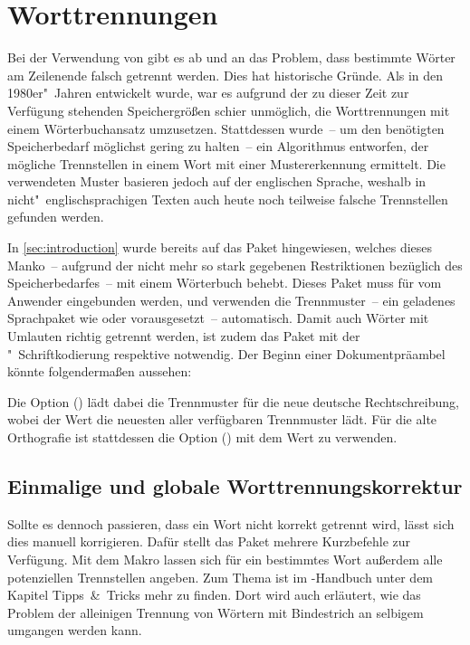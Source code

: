 \documentclass[%
  english,ngerman,%
  cdgeometry=no,DIV=12,automark%
]{tudscrartcl}
\begin{document}
\section{Worttrennungen}
\label{sec:hyphenation}%
%
Bei der Verwendung von  gibt es ab und an das Problem, dass 
bestimmte Wörter am Zeilenende falsch getrennt werden. Dies hat historische 
Gründe. Als  in den 1980er"~Jahren entwickelt wurde, war es 
aufgrund der zu dieser Zeit zur Verfügung stehenden Speichergrößen schier 
unmöglich, die Worttrennungen mit einem Wörterbuchansatz umzusetzen. 
Stattdessen wurde~-- um den benötigten Speicherbedarf möglichst gering zu 
halten~-- ein Algorithmus entworfen, der mögliche Trennstellen in einem Wort 
mit einer Mustererkennung ermittelt. Die verwendeten Muster basieren jedoch 
auf der englischen Sprache, weshalb in nicht"~englischsprachigen Texten auch 
heute noch teilweise falsche Trennstellen gefunden werden.

In \autoref{sec:introduction} wurde bereits auf das Paket 
 hingewiesen, welches dieses Manko~-- aufgrund der nicht 
mehr so stark gegebenen Restriktionen bezüglich des Speicherbedarfes~-- mit 
einem Wörterbuch behebt. Dieses Paket muss für  vom Anwender 
eingebunden werden,  und  verwenden die 
Trennmuster~-- ein geladenes Sprachpaket wie  oder 
 vorausgesetzt~-- automatisch. Damit auch Wörter mit Umlauten 
richtig getrennt werden, ist zudem das Paket  mit der 
"~Schriftkodierung respektive  notwendig. Der 
Beginn einer Dokumentpräambel könnte folgendermaßen aussehen:
%
%
Die Option () lädt dabei die Trennmuster für 
die neue deutsche Rechtschreibung, wobei der Wert  die 
neuesten aller verfügbaren Trennmuster lädt. Für die alte Orthografie ist 
stattdessen die Option () mit dem Wert 
 zu verwenden.


\subsection{Einmalige und globale Worttrennungskorrektur}
Sollte es dennoch passieren, dass ein Wort nicht korrekt getrennt wird, lässt
sich dies manuell korrigieren. Dafür stellt das Paket  mehrere 
Kurzbefehle zur Verfügung. Mit dem Makro  lassen sich für 
ein bestimmtes Wort außerdem alle potenziellen Trennstellen angeben. Zum Thema 
ist im \TUDScript-Handbuch unter dem Kapitel Tipps~\&~Tricks mehr zu finden. 
Dort wird auch erläutert, wie das Problem der alleinigen Trennung von Wörtern 
mit Bindestrich an selbigem umgangen werden kann.
\end{document}
